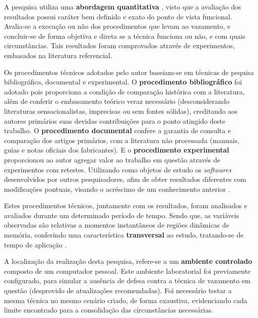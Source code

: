 \documentclass[
	article,			    %
	12pt,				    %
	oneside,			    %
	a4paper,			    %
	chapter=TITLE,		    %
	section=TITLE,		    %
	subsection=TITLE,	    %
	english,			    %
	brazil,				    %
	sumario=tradicional
]{abntex2}
\begin{document}
A pesquisa utiliza uma \textbf{abordagem quantitativa} \cite{Rocha2016Dom}, visto que a avaliação dos resultados possui caráter bem definido e exato do ponto de vista funcional. Avalia-se a execução ou não dos procedimentos que levam ao vazamento, e concluir-se de forma objetiva e direta se a técnica funciona ou não, e com quais circunstâncias. Tais resultados foram comprovados através de experimentos, embasados na literatura referencial.

Os procedimentos técnicos adotados pelo autor baseiam-se em técnicas de pequisa bibliográfica, documental e experimental. O \textbf{procedimento bibliográfico} foi adotado pois proporciona a condição de comparação histórica com a literatura, além de conferir o embasamento teórico veraz necessário (desconsiderando literaturas sensacionalistas, imprecisas ou sem fontes sólidas), creditando aos autores primários suas devidas contribuições para o ponto atingido deste trabalho. O \textbf{procedimento documental} confere a garantia de consulta e comparação dos artigos primários, com a literatura não processada (manuais, guias e notas oficiais dos fabricantes). E o \textbf{procedimento experimental} proporcionou ao autor agregar valor ao trabalho em questão através de experimentos com retestes. Utilizando como objetos de estudo os \emph{softwares} desenvolvidos por outros pesquisadores, afim de obter resultados diferentes com modificações pontuais, visando o acréscimo de um conhecimento anterior \cite{Praca2015Metodologia}.

Estes procedimentos técnicos, juntamente com os resultados, foram analisados e avaliados durante um determinado período de tempo. Sendo que, as variáveis observadas são relativas a momentos instantâneos de regiões dinâmicas de memória, conferindo uma característica \textbf{transversal} ao estudo, tratando-se de tempo de aplicação \cite{Setia2016Methodology}.

A localização da realização desta pesquisa, refere-se a um \textbf{ambiente controlado} composto de um computador pessoal. Este ambiente laboratorial foi previamente configurado, para simular a ausência de defesa contra a técnica de vazamento em questão (desprovido de atualizações recomendadas). Foi necessário testar a mesma técnica no mesmo cenário criado, de forma exaustiva, evidenciando cada limite encontrado para a consolidação das circunstâncias necessárias.

\end{document}
